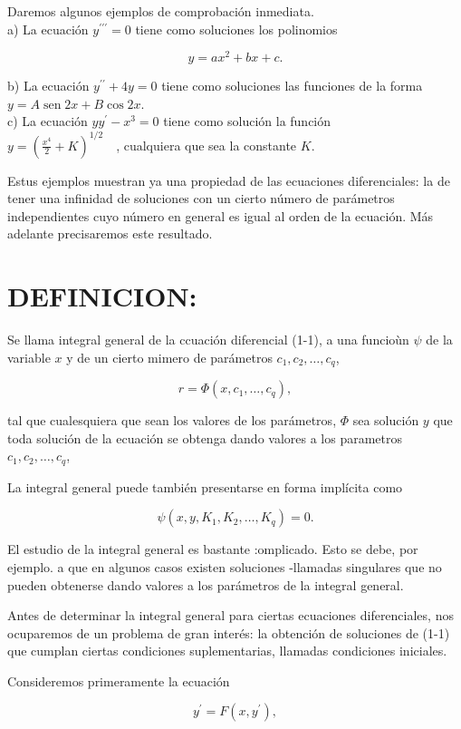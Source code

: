 \documentclass[10pt]{article}
\theoremstyle{plain}
\theoremstyle{definition}
\theoremstyle{remark}
\begin{document}
Daremos algunos ejemplos de comprobación inmediata.\\
a) La ecuación $y^{\prime \prime \prime}=0$ tiene como soluciones los polinomios

$$
y=a x^{2}+b x+c .
$$

b) La ecuación $y^{\prime \prime}+4 y=0$ tiene como soluciones las funciones de la forma $y=A \operatorname{sen} 2 x+B \cos 2 x$.\\
c) La ecuación $y y^{\prime}-x^{3}=0$ tiene como solución la función\\
$y=\left(\frac{x^{4}}{2}+K\right)^{1 / 2} \quad$, cualquiera que sea la constante $K$.


Estus ejemplos muestran ya una propiedad de las ecuaciones diferenciales: la de tener una infinidad de soluciones con un cierto número de parámetros independientes cuyo número en general es igual al orden de la ecuación. Más adelante precisaremos este resultado.

\section*{DEFINICION:}
Se llama integral general de la ccuación diferencial (1-1), a una funcioùn $\psi$ de la variable $x$ y de un cierto mimero de parámetros $c_{1}, c_{2}, \ldots, c_{q}$,

$$
r=\Phi\left(x, c_{1}, \ldots, c_{q}\right),
$$

tal que cualesquiera que sean los valores de los parámetros, $\Phi$ sea solución $y$ que toda solución de la ecuación se obtenga dando valores a los parametros $c_{1}, c_{2}, \ldots, c_{q}$,

La integral general puede también presentarse en forma implícita como

$$
\psi\left(x, y, K_{1}, K_{2}, \ldots, K_{q}\right)=0 .
$$

El estudio de la integral general es bastante :omplicado. Esto se debe, por ejemplo. a que en algunos casos existen soluciones -llamadas singulares que no pueden obtenerse dando valores a los parámetros de la integral general.

Antes de determinar la integral general para ciertas ecuaciones diferenciales, nos ocuparemos de un problema de gran interés: la obtención de soluciones de (1-1) que cumplan ciertas condiciones suplementarias, llamadas condiciones iniciales.

Consideremos primeramente la ecuación


\begin{equation*}
y^{\prime}=F\left(x, y^{\prime}\right), \tag{1-2}
\end{equation*}
\end{document}
